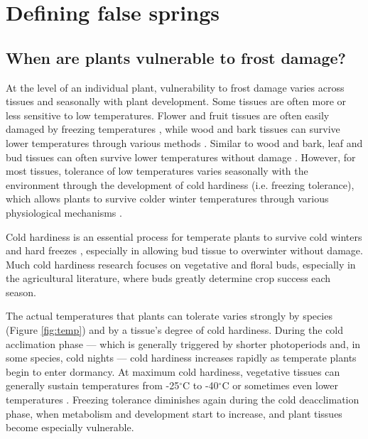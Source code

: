 \documentclass{article}\usepackage[]{graphicx}\usepackage[]{color}
\begin{document}
\section*{Defining false springs} 
\subsection*{When are plants vulnerable to frost damage?} 
At the level of an individual plant, vulnerability to frost damage varies across tissues and seasonally with plant development. Some tissues are often more or less sensitive to low temperatures. Flower and fruit tissues are often easily damaged by freezing temperatures \citep{Augspurger2009, Caradonna2016, Inouye2000, Lenz2013}, while wood and bark tissues can survive lower temperatures through various methods \citep{Strimbeck2015}. Similar to wood and bark, leaf and bud tissues can often survive lower temperatures without damage \citep{Charrier2011}. However, for most tissues, tolerance of low temperatures varies seasonally with the environment through the development of cold hardiness (i.e. freezing tolerance), which allows plants to survive colder winter temperatures through various physiological mechanisms \citep[e.g., deep supercooling, increased solute concentration, and an increase in dehydrins and other proteins,][] {Sakai1987, Strimbeck2015}. 

Cold hardiness is an essential process for temperate plants to survive cold winters and hard freezes \citep{Vitasse2014}, especially in allowing bud tissue to overwinter without damage. Much cold hardiness research focuses on vegetative and floral buds, especially in the agricultural literature, where buds greatly determine crop success each season.

The actual temperatures that plants can tolerate varies strongly by species (Figure \ref{fig:temp}) and by a tissue's degree of cold hardiness. During the cold acclimation phase --- which is generally triggered by shorter photoperiods \citep{Howe2003, Charrier2011, Strimbeck2015, Welling1997} and, in some species, cold nights \citep{Charrier2011, Heide2005} --- cold hardiness increases rapidly as temperate plants begin to enter dormancy. At maximum cold hardiness, vegetative tissues can generally sustain temperatures from -25$^{\circ}$C to -40$^{\circ}$C \citep{Charrier2011,Korner2012,Vitasse2014} or sometimes even lower temperatures \citep[to -60$^{\circ}$C in extreme cases,][] {Korner2012}. Freezing tolerance diminishes again during the cold deacclimation phase, when metabolism and development start to increase, and plant tissues become especially vulnerable. 
\end{document}
